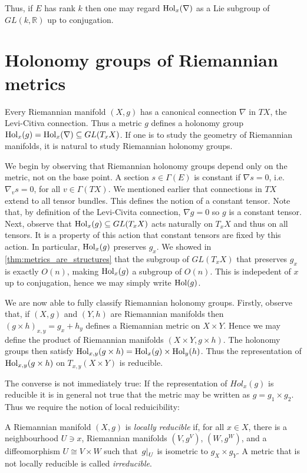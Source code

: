 \documentclass{article}
\begin{document}
Thus, if $E$ has rank $k$ then one may regard $\operatorname{Hol}_x(\nabla)$ as
a Lie subgroup of $GL(k,\mathbb{R})$ up to conjugation.

\section{Holonomy groups of Riemannian metrics}

Every Riemannian manifold $(X,g)$ has a canonical connection
$\nabla$ in $TX$, the Levi-Citiva connection. Thus a metric $g$
defines a holonomy group $\operatorname{Hol}_x(g) = \operatorname{Hol}_x(\nabla)\subseteq GL(T_x X)$.
If one is to study the geometry of Riemannian manifolds, it is natural
to study Riemannian holonomy groups.

We begin by observing that Riemannian holonomy groups depend only on the
metric, not on the base point.
A section $s\in\Gamma(E)$ is constant if $\nabla s = 0$, i.e. $\nabla_v s=0$, for all $v\in\Gamma(TX)$. We mentioned earlier that connections in
$TX$ extend to all tensor bundles. This defines the notion of a constant
tensor. Note that, by definition of the Levi-Civita connection,
$\nabla g = 0$ so $g$ is a constant tensor.
Next, observe that $\operatorname{Hol}_x(g)\subseteq GL(T_x X)$ acts naturally
on $T_x X$ and thus on all tensors. It is a property of this action that
constant tensors are fixed by this action. In particular,
$\operatorname{Hol}_x(g)$ preserves $g_x$. We showed in \ref{thm:metrics_are_structures} that the subgroup of $GL(T_x X)$ that preserves $g_x$ is exactly
$O(n)$, making $\operatorname{Hol}_x(g)$ a subgroup of $O(n)$. This is indepedent of
$x$ up to conjugation, hence we may simply write $\operatorname{Hol}(g)$.

We are now able to fully classify Riemannian holonomy groups.
Firstly, observe that, if $(X,g)$ and $(Y,h)$ are Riemannian
manifolds then $(g\times h)_{x,y} = g_x + h_y$ defines a Riemannian
metric on $X\times Y$. Hence we may define
the product of Riemannian manifolds $(X\times Y,g\times h)$.
The holonomy groups then satisfy $\operatorname{Hol}_{x,y}(g\times
h)=\operatorname{Hol}_x(g)\times\operatorname{Hol}_y(h)$. Thus the representation of
$\operatorname{Hol}_{x,y}(g\times h)$ on $T_{x,y}(X\times Y)$ is reducible.

The converse is not immediately true: If the representation of
$Hol_x(g)$ is reducible it is in general not true that the metric
may be written as $g=g_1\times g_2$. Thus we require the notion of
local reduicibility:

\begin{definition}
  A Riemannian manifold $(X,g)$ is \emph{locally reducible} if, for
  all $x\in X$, there is a neighbourhood $U\ni x$, Riemannian manifolds
  $(V,g^V)$, $(W,g^W)$, and a diffeomorphism $U\cong V\times W$ such that
  $\left.{g}\right\vert_{U}$ is isometric to $g_X\times g_Y$.
  A metric that is not locally reducible is called \emph{irreducible}.
\end{definition}
\end{document}
